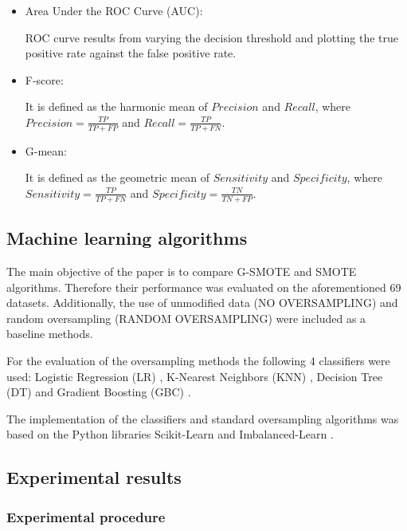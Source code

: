 \documentclass[parskip=full]{scrartcl}
\begin{document}
\begin{itemize}
	
	\renewcommand\labelitemi{--}
	
	\item Area Under the ROC Curve (AUC):
	
	ROC curve results from varying the decision threshold and plotting the true
	positive rate against the false positive rate.
	
	\item F-score:
	
	It is defined as the harmonic mean of \(Precision\) and \(Recall\), where
	\(Precision = \frac{TP}{TP + FP}\) and \(Recall = \frac{TP}{TP + FN}\).
	
	\item G-mean:
	
	It is defined as the geometric mean of \(Sensitivity\) and \(Specificity\),
	where \(Sensitivity = \frac{TP}{TP + FN}\) and \(Specificity = \frac{TN}{TN
	+ FP}\).
	
\end{itemize}

\subsection{Machine learning algorithms}

The main objective of the paper is to compare G-SMOTE and SMOTE algorithms.
Therefore their performance was evaluated on the aforementioned 69 datasets.
Additionally, the use of unmodified data (NO OVERSAMPLING) and random
oversampling (RANDOM OVERSAMPLING) were included as a baseline methods.

For the evaluation of the oversampling methods the following 4 classifiers were
used: Logistic Regression (LR) \cite{McCullagh1989}, K-Nearest Neighbors (KNN)
\cite{Cover1967}, Decision Tree (DT) \cite{Salzberg1994} and Gradient Boosting
(GBC) \cite{Friedman2001}.

The implementation of the classifiers and standard oversampling algorithms was
based on the Python libraries Scikit-Learn \cite{Pedregosa2011} and
Imbalanced-Learn \cite{Lemaitre2016}.

\subsection{Experimental results}

\subsubsection{Experimental procedure}
\end{document}

